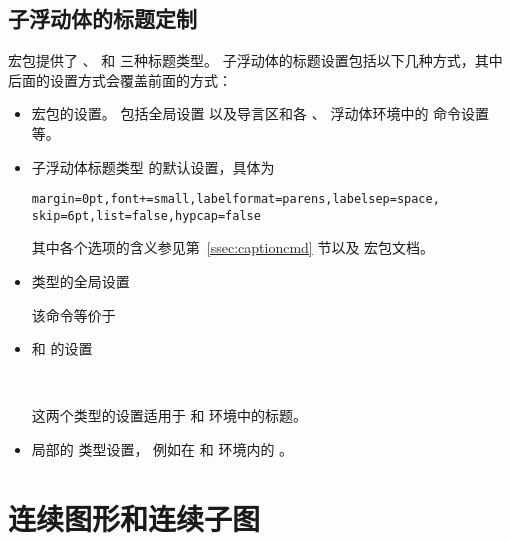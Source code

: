 \subsection{子浮动体的标题定制}

 宏包提供了 、 和  三种标题类型。
子浮动体的标题设置包括以下几种方式，其中后面的设置方式会覆盖前面的方式：
\begin{itemize}
	\item {} 宏包的设置。
	包括全局设置  以及导言区和各 、 浮动体环境中的  命令设置等。
	
	\item 子浮动体标题类型  的默认设置，具体为
\begin{lstlisting}
margin=0pt,font+=small,labelformat=parens,labelsep=space,
skip=6pt,list=false,hypcap=false
\end{lstlisting}
	其中各个选项的含义参见第~\ref{ssec:captioncmd} 节以及  宏包文档\cite{caption-doc}。
	
	\item {} 类型的全局设置
	\begin{center}
	\end{center}
	该命令等价于
	\begin{center}
	\end{center}
	
	\item {} 和  的设置
	\begin{center}
		\\
	\end{center}
	这两个类型的设置适用于  和  环境中的标题。
	
	\item 局部的  类型设置，
	例如在  和  环境内的 。
\end{itemize}

\section{连续图形和连续子图}\label{sec:contfig}


